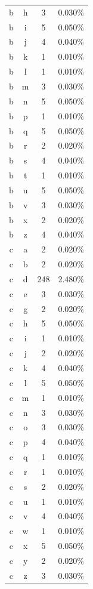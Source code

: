 \begin{longtable}{cccc}
    b & h & 3 & 0.030\% \\
    b & i & 5 & 0.050\% \\
    b & j & 4 & 0.040\% \\
    b & k & 1 & 0.010\% \\
    b & l & 1 & 0.010\% \\
    b & m & 3 & 0.030\% \\
    b & n & 5 & 0.050\% \\
    b & p & 1 & 0.010\% \\
    b & q & 5 & 0.050\% \\
    b & r & 2 & 0.020\% \\
    b & s & 4 & 0.040\% \\
    b & t & 1 & 0.010\% \\
    b & u & 5 & 0.050\% \\
    b & v & 3 & 0.030\% \\
    b & x & 2 & 0.020\% \\
    b & z & 4 & 0.040\% \\
    c & a & 2 & 0.020\% \\
    c & b & 2 & 0.020\% \\
    c & d & 248 & 2.480\% \\
    c & e & 3 & 0.030\% \\
    c & g & 2 & 0.020\% \\
    c & h & 5 & 0.050\% \\
    c & i & 1 & 0.010\% \\
    c & j & 2 & 0.020\% \\
    c & k & 4 & 0.040\% \\
    c & l & 5 & 0.050\% \\
    c & m & 1 & 0.010\% \\
    c & n & 3 & 0.030\% \\
    c & o & 3 & 0.030\% \\
    c & p & 4 & 0.040\% \\
    c & q & 1 & 0.010\% \\
    c & r & 1 & 0.010\% \\
    c & s & 2 & 0.020\% \\
    c & u & 1 & 0.010\% \\
    c & v & 4 & 0.040\% \\
    c & w & 1 & 0.010\% \\
    c & x & 5 & 0.050\% \\
    c & y & 2 & 0.020\% \\
    c & z & 3 & 0.030\% \\

\end{longtable}
